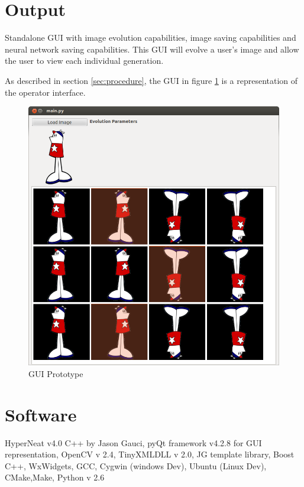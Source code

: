 \documentclass[a4paper,10pt]{article}
\begin{document}
\section{Output}

Standalone GUI with image evolution capabilities, image saving capabilities and neural network saving capabilities. This GUI will evolve a user’s image and allow the user to view each individual generation.

As described in section \ref{sec:procedure}, the GUI in figure \ref{fig:gui} is a representation of the operator interface.

\begin{figure}
    \includegraphics[width=\textwidth]{rec/gui_ss.png}
    \caption{GUI Prototype}
    \label{fig:gui}
\end{figure}

\section{Software}

HyperNeat v4.0 C++ by Jason Gauci, pyQt framework v4.2.8 for GUI representation, OpenCV v 2.4, TinyXMLDLL v 2.0, JG template library, Boost C++, WxWidgets, GCC, Cygwin (windows Dev), Ubuntu (Linux Dev), CMake,Make, Python v 2.6
\end{document}
